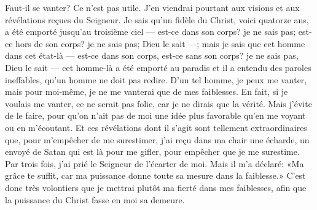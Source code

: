 Faut-il se vanter? Ce n’est pas utile.
J’en viendrai pourtant aux visions et aux révélations reçues du Seigneur.
Je sais qu’un fidèle du Christ, voici quatorze ans, a été emporté jusqu’au troisième ciel
	--- est-ce dans son corps? je ne sais pas;
	est-ce hors de son corps? je ne sais pas; Dieu le sait ---;
	mais je sais que cet homme dans cet état-là
	--- est-ce dans son corps, est-ce sans son corps?
	je ne sais pas, Dieu le sait ---
	cet homme-là a été emporté au paradis
	et il a entendu des paroles ineffables, qu’un homme ne doit pas redire.
D’un tel homme, je peux me vanter,
	mais pour moi-même, je ne me vanterai que de mes faiblesses.
En fait, si je voulais me vanter, ce ne serait pas folie,
	car je ne dirais que la vérité.
Mais j’évite de le faire,
	pour qu’on n’ait pas de moi une idée plus favorable
		qu’en me voyant ou en m’écoutant.
Et ces révélations dont il s’agit sont tellement extraordinaires
	que, pour m’empêcher de me surestimer,
	j’ai reçu dans ma chair une écharde,
	un envoyé de Satan qui est là pour me gifler,
	pour empêcher que je me surestime.
Par trois fois, j’ai prié le Seigneur de l’écarter de moi.
Mais il m’a déclaré: «Ma grâce te suffit,
	car ma puissance donne toute sa mesure dans la faiblesse.»
C’est donc très volontiers que je mettrai plutôt ma fierté dans mes faiblesses,
	afin que la puissance du Christ fasse en moi sa demeure.

